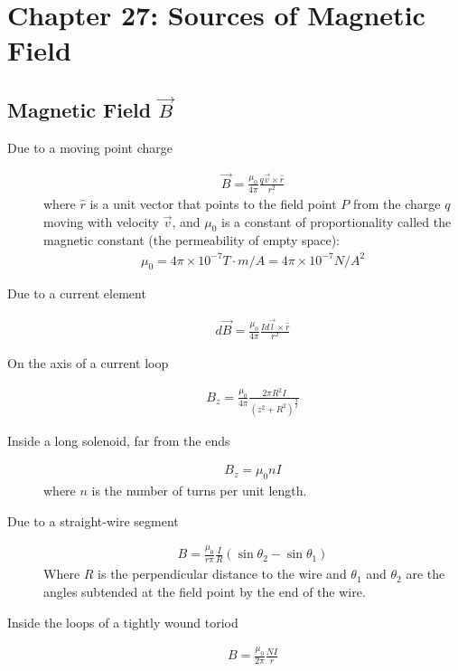\documentclass[../main.tex]{subfiles}
\begin{document}
\section{Chapter 27: Sources of Magnetic Field}
\label{sec:chapter_27_sources_of_magnetic_field}

\subsection{Magnetic Field $\vec{B}$}
\label{sub:magnetic_field_b_}

\begin{description}
  \item[Due to a moving point charge]
    \begin{align}
      \vec{B} = \frac{\mu_0}{4\pi}\frac{q\vec{v}\times\hat{r}}{r^2}
    \end{align}
    where $\hat{r}$ is a unit vector that points to the field point $P$ from
    the charge $q$ moving with velocity $\vec{v}$, and $\mu_0$ is a constant of
    proportionality called the magnetic constant (the permeability of empty
    space):
    \begin{align}
      \mu_0 = 4\pi\times10^{-7}T\cdot m/A=4\pi\times10^{-7}N/A^2
    \end{align}
  \item[Due to a current element]
    \begin{align}
      d\vec{B} = \frac{\mu_0}{4\pi}\frac{Id\vec{l}\times\hat{r}}{r^2}
    \end{align}
  \item[On the axis of a current loop]
    \begin{align}
      B_z = \frac{\mu_0}{4\pi}\frac{2\pi R^2I}{{\left(z^2+R^2\right)}^{\frac{3}{2}}}
    \end{align}
  \item[Inside a long solenoid, far from the ends]
    \begin{align}
      B_z = \mu_{0}nI
    \end{align}
    where $n$ is the number of turns per unit length.
  \item[Due to a straight-wire segment]
    \begin{align}
      B = \frac{\mu_0}{r\pi}\frac{I}{R}\left(\sin\theta_2-\sin\theta_1\right)
    \end{align}
    Where $R$ is the perpendicular distance to the wire and $\theta_1$ and
    $\theta_2$ are the angles subtended at the field point by the end of the
    wire.
  \item[Inside the loops of a tightly wound toriod]
    \begin{align}
      B = \frac{\mu_0}{2\pi}\frac{NI}{r}
    \end{align}
\end{description}
\end{document}
